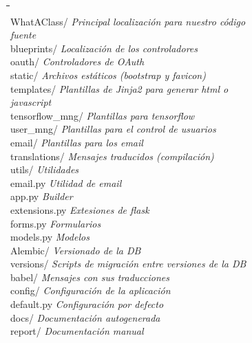 \begin{tabbing}
\hphantom{tab }\= \hphantom{tab }\= \hphantom{tab }\= \hphantom{tab }\= \hphantom{quadruple tabula}\= \kill\\
WhatAClass/ \> \> \> \> \> \textit{Principal localización para nuestro código} \\
\> \> \> \> \> \textit{fuente}\\
\> blueprints/ \> \> \> \> \textit{Localización de los controladores} \\
\> \> oauth/ \> \> \> \textit{Controladores de OAuth} \\
\> static/ \> \> \> \> \textit{Archivos estáticos (bootstrap y favicon)}\\
\> templates/ \> \> \> \> \textit{Plantillas de Jinja2 para generar html o} \\ 
\> \> \> \> \> \textit{javascript} \\
\> \> tensorflow\_mng/ \> \> \> \textit{Plantillas para tensorflow}\\
\> \> user\_mng/\> \> \> \textit{Plantillas para el control de usuarios}\\
\> \> \> email/ \> \> \textit{Plantillas para los email}\\
\> translations/ \> \> \> \> \textit{Mensajes traducidos (compilación)} \\
\> utils/ \> \> \> \> \textit{Utilidades} \\
\> \> email.py \> \> \> \textit{Utilidad de email}\\
\> app.py \> \> \> \> \textit{Builder}\\
\> extensions.py \> \> \> \> \textit{Extesiones de flask}\\
\> forms.py \> \> \> \> \textit{Formularios}\\
\> models.py \> \> \> \> \textit{Modelos}\\
Alembic/ \> \> \> \> \> \textit{Versionado de la DB}\\
\> versions/ \> \> \> \> \textit{Scripts de migración entre versiones de la DB}\\
babel/ \> \> \> \> \> \textit{Mensajes con sus traducciones}\\
config/ \> \> \> \> \> \textit{Configuración de la aplicación}\\
\> default.py \> \> \> \> \textit{Configuración por defecto}\\
docs/ \> \> \> \> \> \textit{Documentación autogenerada}\\
report/ \> \> \> \> \> \textit{Documentación manual}\\

\end{tabbing}

